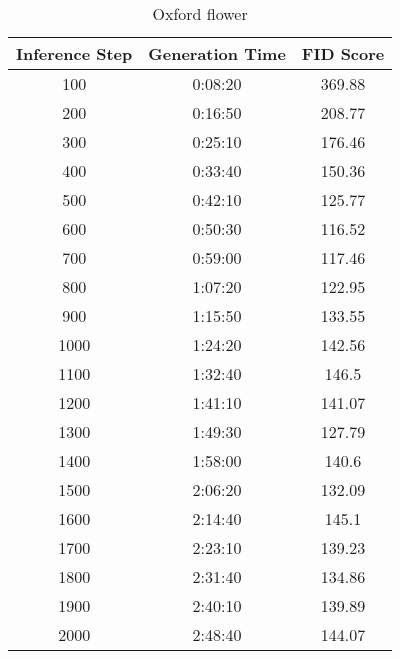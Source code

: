 \begin{table}
    \centering
\begin{tabular}{ |c|c|c| } 
 \hline
 Inference Step & Generation Time & FID Score \\  
 \hline
 100 & 0:08:20 & 369.88 \\
\hline
200 & 0:16:50 & 208.77 \\
\hline
300 & 0:25:10 & 176.46 \\
\hline
400 & 0:33:40 & 150.36 \\
\hline
500 & 0:42:10 & 125.77 \\
\hline
600 & 0:50:30 & 116.52 \\
\hline
700 & 0:59:00 & 117.46 \\
\hline
800 & 1:07:20 & 122.95 \\
\hline
900 & 1:15:50 & 133.55 \\
\hline
1000 & 1:24:20 & 142.56 \\
\hline
1100 & 1:32:40 & 146.5 \\
\hline
1200 & 1:41:10 & 141.07 \\
\hline
1300 & 1:49:30 & 127.79 \\
\hline
1400 & 1:58:00 & 140.6 \\
\hline
1500 & 2:06:20 & 132.09 \\
\hline
1600 & 2:14:40 & 145.1 \\
\hline
1700 & 2:23:10 & 139.23 \\
\hline
1800 & 2:31:40 & 134.86 \\
\hline
1900 & 2:40:10 & 139.89 \\
\hline
2000 & 2:48:40 & 144.07 \\
\hline

\end{tabular}
    \caption{Oxford flower}
    \label{table:oxford_flower}
\end{table}